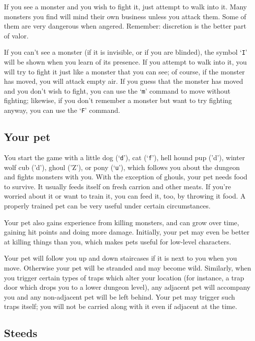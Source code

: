 If you see a monster and you wish to fight it, just attempt to walk
into it.  Many monsters you find will mind their own business unless
you attack them.  Some of them are very dangerous when angered.
Remember:  discretion is the better part of valor.

If you can't see a monster (if it is invisible, or if you are blinded),
the symbol `{\tt I}' will be shown when you learn of its presence.
If you attempt to walk into it, you will try to fight it just like
a monster that you can see; of course,
if the monster has moved, you will attack empty air.  If you guess
that the monster has moved and you don't wish to fight, you can use the `{\tt m}'
command to move without fighting; likewise, if you don't remember a monster
but want to try fighting anyway, you can use the `{\tt F}' command.
\subsection*{Your pet}


You start the game with a little dog (`{\tt d}'), cat (`{\tt f}'), hell hound pup ('d'),
winter wolf cub ('d'), ghoul ('Z'), or pony (`{\tt u}'), which follows you about
the dungeon and fights monsters with you.  With the exception of ghouls, your
pet needs food to survive.  It usually feeds itself on fresh carrion
and other meats.  If you're worried about it or want to train it, you
can feed it, too, by throwing it food.  A properly trained pet can be
very useful under certain circumstances.

Your pet also gains experience from killing monsters, and can grow
over time, gaining hit points and doing more damage.  Initially, your
pet may even be better at killing things than you, which makes pets
useful for low-level characters.

Your pet will follow you up and down staircases if it is next to you
when you move.  Otherwise your pet will be stranded and may become
wild.  Similarly, when you trigger certain types of traps which alter
your location (for instance, a trap door which drops you to a lower
dungeon level), any adjacent pet will accompany you and any non-adjacent
pet will be left behind.  Your pet may trigger such traps itself; you
will not be carried along with it even if adjacent at the time.
\subsection*{Steeds}

